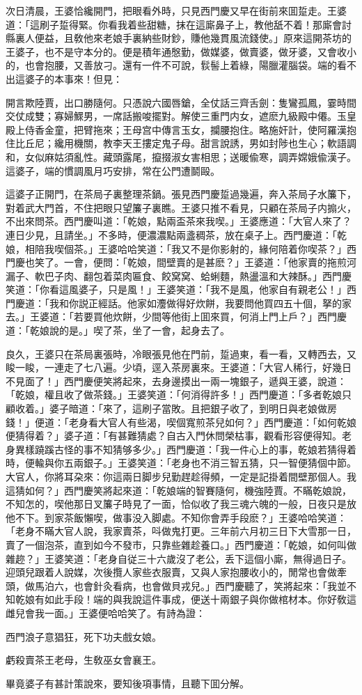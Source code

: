 次日清晨，王婆恰纔開門，把眼看外時，只見西門慶又早在街前來囬踅走。王婆道：「這刷子踅得緊。你看我着些甜糖，抹在這廝鼻子上，教他舐不着！那廝會討縣裏人便益，且敎他來老娘手裏納些財鈔，賺他幾貫風流錢使。」原來這開茶坊的王婆子，也不是守本分的。便是積年通慇勤，做媒婆，做賣婆，做牙婆，又會收小的，也會抱腰，又善放刁。還有一件不可說，䯼髻上着綠，陽臘灌腦袋。端的看不出這婆子的本事來！但見：

\begin{myquote}
開言欺陸賈，出口勝隨何。只憑說六國唇鎗，全仗話三齊舌劍：隻鸞孤鳳，霎時間交仗成雙；寡婦鰥男，一席話搬唆擺對。解使三重門内女，遮麽九級殿中僊。玉皇殿上侍香金童，把臂拖來；王母宫中傳言玉女，攔腰抱住。略施奸計，使阿羅漢抱住比丘尼；纔用機關，教李天王摟定鬼子母。甜言說誘，男如封陟也生心；軟語調和，女似麻姑須亂性。藏頭露尾，攛掇淑女害相思；送暖偸寒，調弄嫦娥偸漢子。這婆子，端的慣調風月巧安排，常在公門遭鬬毆。
\end{myquote}

這婆子正開門，在茶局子裏整理茶鍋。張見西門慶踅過幾遍，奔入茶局子水簾下，對着武大門首，不住把眼只望簾子裏瞧。王婆只推不看見，只顧在茶局子内搧火，不出來問茶。西門慶叫道：「乾娘，點兩盃茶來我喫。」王婆應道：「大官人來了？連日少見，且請坐。」不多時，便濃濃點兩盞稠茶，放在桌子上。西門慶道：「乾娘，相陪我喫個茶。」王婆哈哈笑道：「我又不是你影射的，緣何陪着你喫茶？」西門慶也笑了。一會，便問：「乾娘，間壁賣的是甚麽？」王婆道：「他家賣的拖煎河漏子、軟巴子肉、翻包着菜肉匾食、餃窝窝、蛤蜊麵，熱盪溫和大辣酥。」西門慶笑道：「你看這風婆子，只是風！」王婆笑道：「我不是風，他家自有親老公！」西門慶道：「我和你説正經話。他家如灋做得好炊餅，我要問他買四五十個，拏的家去。」王婆道：「若要買他炊餅，少間等他街上囬來買，何消上門上戶？」西門慶道：「乾娘說的是。」喫了茶，坐了一會，起身去了。

良久，王婆只在茶局裏張時，冷眼張見他在門前，踅過東，看一看，又轉西去，又睃一睃，一連走了七八遍。少頃，逕入茶房裏來。王婆道：「大官人稀行，好幾日不見面了！」西門慶便笑將起來，去身邊摸出一兩一塊銀子，遞與王婆，說道：「乾娘，權且收了做茶錢。」王婆笑道：「何消得許多！」西門慶道：「多者乾娘只顧收着。」婆子暗道：「來了，這刷子當敗。且把銀子收了，到明日與老娘做房錢！」便道：「老身看大官人有些渴，喫個寬煎茶兒如何？」西門慶道：「如何乾娘便猜得着？」婆子道：「有甚難猜處？自古入門休問榮枯事，觀看形容便得知。老身異樣蹺蹊古怪的事不知猜够多少。」西門慶道：「我一件心上的事，乾娘若猜得着時，便輸與你五兩銀子。」王婆笑道：「老身也不消三智五猜，只一智便猜個中節。大官人，你將耳朶來：你這兩日脚步兒勤趕趁得頻，一定是記掛着間壁那個人。我這猜如何？」西門慶笑將起來道：「乾娘端的智賽隨何，機強陸賈。不瞞乾娘說，不知怎的，喫他那日叉簾子時見了一面，恰似收了我三魂六魄的一般，日夜只是放他不下。到家茶飯懶喫，做事没入脚處。不知你會弄手段麽？」王婆哈哈笑道：「老身不瞞大官人說，我家賣茶，呌做鬼打更。三年前六月初三日下大雪那一日，賣了一個泡茶，直到如今不發市，只靠些雜趁養口。」西門慶道：「乾娘，如何叫做雜趂？」王婆笑道：「老身自従三十六歲沒了老公，丢下這個小廝，無得過日子。迎頭兒跟着人說媒，次後攬人家些衣服賣，又與人家抱腰收小的，閒常也會做牽頭，做馬泊六，也會針灸看病，也會做貝戎兒。」西門慶聽了，笑將起來：「我並不知乾娘有如此手段！端的與我說這件事成，便送十兩銀子與你做棺材本。你好敎這雌兒會我一面。」王婆便哈哈笑了。有詩為證：

\begin{myquote}
西門浪子意猖狂，死下功夫戲女娘。

虧殺賣茶王老母，生敎巫女會襄王。
\end{myquote}

畢竟婆子有甚計策說來，要知後項事情，且聽下囬分解。

